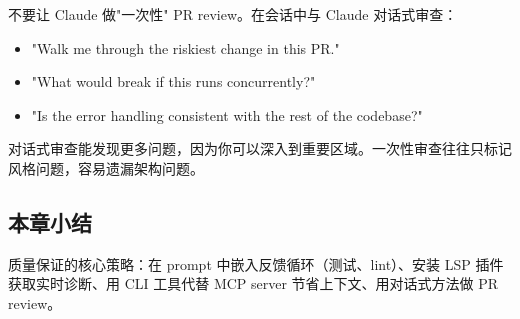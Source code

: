 不要让 Claude 做"一次性" PR review。在会话中与 Claude 对话式审查：
\begin{itemize}
  \item "Walk me through the riskiest change in this PR."
  \item "What would break if this runs concurrently?"
  \item "Is the error handling consistent with the rest of the codebase?"
\end{itemize}

对话式审查能发现更多问题，因为你可以深入到重要区域。一次性审查往往只标记风格问题，容易遗漏架构问题。

\subsection{本章小结}

质量保证的核心策略：在 prompt 中嵌入反馈循环（测试、lint）、安装 LSP 插件获取实时诊断、用 CLI 工具代替 MCP server 节省上下文、用对话式方法做 PR review。

